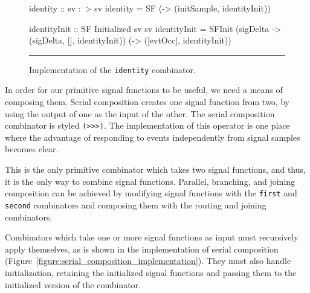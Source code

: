 \documentclass[draft]{llncs}
\begin{document}
\begin{figure}
\begin{code}
identity :: sv :~> sv
identity =
  SF (\initSample -> (initSample, identityInit))

identityInit :: SF Initialized sv sv
identityInit =
  SFInit (\dt sigDelta -> (sigDelta, [], identityInit))
         (\evtOcc -> ([evtOcc], identityInit))
\end{code}
\hrule
\caption{Implementation of the {\tt identity} combinator.}
\label{figure:identity_implementation}
\end{figure}

In order for our primitive signal functions to be useful, we need a means of
composing them. Serial composition creates one signal function from two, by
using the output of one as the input of the other. The serial composition
combinator is styled {\tt (>>>)}. The implementation of this operator is one
place where the advantage of responding to events independently from signal
samples becomes clear. 

This is the only primitive combinator which takes two signal functions, and
thus, it is the only way to combine signal functions. Parallel, branching, and
joining composition can be achieved by modifying signal functions with the
{\tt first} and {\tt second} combinators and composing them with the
routing and joining combinators.

Combinators which take one or more signal functions as input must recursively
apply themselves, as is shown in the implementation of serial composition
(Figure~\ref{figure:serial_composition_implementation}). They must also
handle initialization, retaining the initialized signal functions and passing
them to the initialized version of the combinator.
\end{document}
